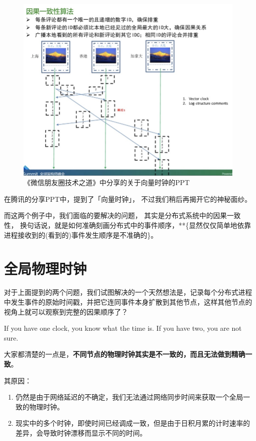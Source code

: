 \documentclass[cn,11pt,chinese]{elegantbook}
\providecommand{\tightlist}{%
  \setlength{\itemsep}{0pt}\setlength{\parskip}{0pt}}
\renewenvironment{quote}{\begin{customblockquote}\list{}{\rightmargin=0em\leftmargin=0em}%
\item\relax\color{blockquote-text}\ignorespaces}{\unskip\unskip\endlist\end{customblockquote}}
\begin{document}
\begin{figure}
\centering
\includegraphics{images/appendix-a-04.jpeg}
\caption{《微信朋友圈技术之道》中分享的关于向量时钟的PPT}
\end{figure}

在腾讯的分享PPT中，提到了「向量时钟」， 不过我们稍后再揭开它的神秘面纱。

而这两个例子中，我们面临的要解决的问题，
其实是分布式系统中的因果一致性，
换句话说，就是如何准确刻画分布式中的事件顺序，**\{显然仅仅简单地依靠进程接收到的(看到的)事件发生顺序是不准确的\}。

\hypertarget{ux5168ux5c40ux7269ux7406ux65f6ux949f}{%
\section{全局物理时钟}\label{ux5168ux5c40ux7269ux7406ux65f6ux949f}}

对于上面提到的两个问题，我们试图解决的一个天然想法是，记录每个分布式进程中发生事件的原始时间戳，并把它连同事件本身扩散到其他节点，这样其他节点的视角上就可以观察到完整的因果顺序了？

\begin{quote}
If you have one clock, you know what the time is. If you have two, you
are not sure.
\end{quote}

大家都清楚的一点是，\textbf{不同节点的物理时钟其实是不一致的，而且无法做到精确一致}。

其原因：

\begin{enumerate}
\def\labelenumi{\arabic{enumi}.}
\tightlist
\item
  仍然是由于网络延迟的不确定，我们无法通过网络同步时间来获取一个全局一致的物理时钟。
\item
  现实中的多个时钟，即使时间已经调成一致，但是由于日积月累的计时速率的差异，会导致时钟漂移而显示不同的时间。
\end{enumerate}
\end{document}
